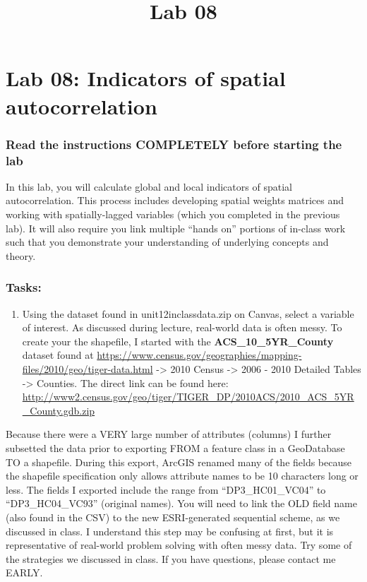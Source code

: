\documentclass[]{article}
\title{Lab 08}
\author{}
\date{}
\makeatletter
\providecommand{\tightlist}{%
  \setlength{\itemsep}{0pt}\setlength{\parskip}{0pt}}
\renewcommand{\maketitle}{\bgroup\vspace*{-1cm}\setlength{\parindent}{0pt}
\begin{flushleft}
  \@author
  
  \@date
  
\end{flushleft}\egroup
}
\makeatother
\begin{document}
\maketitle

\hypertarget{lab-08-indicators-of-spatial-autocorrelation}{%
\section{Lab 08: Indicators of spatial
autocorrelation}\label{lab-08-indicators-of-spatial-autocorrelation}}

\hypertarget{read-the-instructions-completely-before-starting-the-lab}{%
\subsubsection{Read the instructions COMPLETELY before starting the
lab}\label{read-the-instructions-completely-before-starting-the-lab}}

In this lab, you will calculate global and local indicators of spatial
autocorrelation. This process includes developing spatial weights
matrices and working with spatially-lagged variables (which you
completed in the previous lab). It will also require you link multiple
``hands on'' portions of in-class work such that you demonstrate your
understanding of underlying concepts and theory.

\hypertarget{tasks}{%
\subsubsection{Tasks:}\label{tasks}}

\begin{enumerate}
\def\labelenumi{\arabic{enumi}.}
\tightlist
\item
  Using the dataset found in unit12inclassdata.zip on Canvas, select a
  variable of interest. As discussed during lecture, real-world data is
  often messy. To create your the shapefile, I started with the
  \textbf{ACS\_10\_5YR\_County} dataset found at
  \url{https://www.census.gov/geographies/mapping-files/2010/geo/tiger-data.html}
  -\textgreater{} 2010 Census -\textgreater{} 2006 - 2010 Detailed
  Tables -\textgreater{} Counties. The direct link can be found here:
  \url{http://www2.census.gov/geo/tiger/TIGER_DP/2010ACS/2010_ACS_5YR_County.gdb.zip}
\end{enumerate}

Because there were a VERY large number of attributes (columns) I further
subsetted the data prior to exporting FROM a feature class in a
GeoDatabase TO a shapefile. During this export, ArcGIS renamed many of
the fields because the shapefile specification only allows attribute
names to be 10 characters long or less. The fields I exported include
the range from ``DP3\_HC01\_VC04'' to ``DP3\_HC04\_VC93'' (original
names). You will need to link the OLD field name (also found in the CSV)
to the new ESRI-generated sequential scheme, as we discussed in class. I
understand this step may be confusing at first, but it is representative
of real-world problem solving with often messy data. Try some of the
strategies we discussed in class. If you have questions, please contact
me EARLY.
\end{document}
